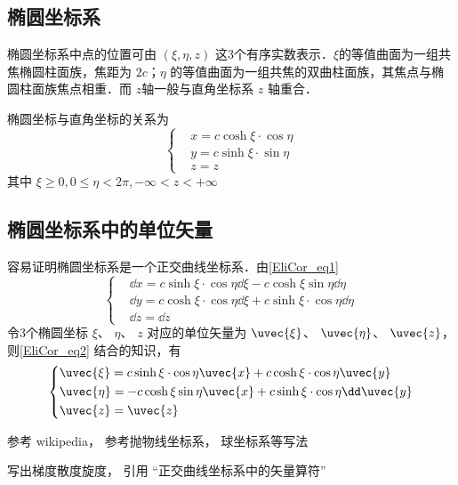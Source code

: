 \begin{issues}
\issueDraft
\end{issues}
\subsection{椭圆坐标系}
椭圆坐标系中点的位置可由 $(\xi,\eta,z)$ 这3个有序实数表示．$\xi$的等值曲面为一组共焦椭圆柱面族，焦距为 $2c$；$\eta$ 的等值曲面为一组共焦的双曲柱面族，其焦点与椭圆柱面族焦点相重．而 $z$轴一般与直角坐标系 $z$ 轴重合．

椭圆坐标与直角坐标的关系为
\begin{equation}\label{EliCor_eq1}
\left\{\begin{aligned}
&x=c\cosh\xi\cdot\cos\eta\\
&y=c\sinh\xi\cdot\sin\eta\\
&z=z
\end{aligned}\right.
\end{equation}
其中 $\xi\geq0,0\leq\eta<2\pi,-\infty<z<+\infty$
\subsection{椭圆坐标系中的单位矢量}
容易证明椭圆坐标系是一个正交曲线坐标系．由\autoref{EliCor_eq1} 
\begin{equation}\label{EliCor_eq2}
\left\{
    \begin{aligned}
    &\dd x=c\sinh\xi\cdot\cos\eta\dd\xi-c\cosh\xi\sin\eta\dd\eta\\
    &\dd y=c\cosh\xi\cdot\cos\eta\dd\xi+c\sinh\xi\cdot\cos\eta\dd\eta\\
    &\dd z=\dd z
    \end{aligned}\right.
\end{equation}
令3个椭圆坐标 $\xi$、 $\eta$、 $z$ 对应的单位矢量为 $\uvec{\xi}$、 $\uvec{\eta}$、 $\uvec{z}$，则\autoref{EliCor_eq2} 结合的知识，有
\begin{equation}
\left\{
    \begin{aligned}
    &\uvec{\xi}=c\sinh\xi\cdot\cos\eta\uvec{x}+c\cosh\xi\cdot\cos\eta\uvec{y}\\
    &\uvec{\eta }=-c\cosh\xi\sin\eta\uvec{x}+c\sinh\xi\cdot\cos\eta\dd\uvec{y}\\
    &\uvec{z}=\uvec{z}
    \end{aligned}\right.
\end{equation}


参考 wikipedia， 参考抛物线坐标系， 球坐标系等写法

写出梯度散度旋度， 引用 “正交曲线坐标系中的矢量算符”
